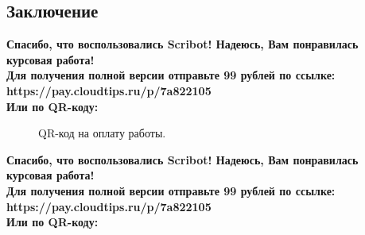 \documentclass{article}
\begin{document}
\begin{center}
\section{Заключение}
\begin{center}
    \textbf{
        Спасибо, что воспользовались Scribot! Надеюсь, Вам понравилась курсовая работа!\\
        Для получения полной версии отправьте 99 рублей по ссылке:\\
        https://pay.cloudtips.ru/p/7a822105\\
        Или по QR-коду:\\
    }
\end{center}
\begin{figure}[h]
    \caption{QR-код на оплату работы.}
    \label{ris:image}
\end{figure}
\newpage
\begin{center}
    \textbf{
        Спасибо, что воспользовались Scribot! Надеюсь, Вам понравилась курсовая работа!\\
        Для получения полной версии отправьте 99 рублей по ссылке:\\
        https://pay.cloudtips.ru/p/7a822105\\
        Или по QR-коду:\\
}
\end{center}
\end{center}
\end{document}
